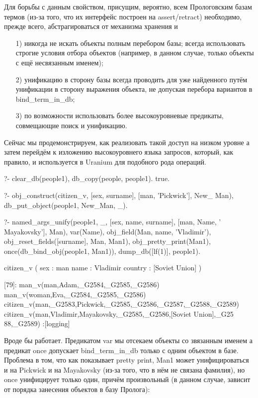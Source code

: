 \documentclass[a4paper]{book}
\def\ur{Uranium}
\begin{document}
Для борьбы с данным свойством, присущим, вероятно, всем
Прологовским базам термов (из-за того, что их интерфейс построен
на assert/retract) необходимо, прежде всего, абстрагироваться от
механизма хранения и 
\begin{itemize}
\item[1)] никогда не искать объекты полным перебором базы; всегда
  использовать строгие условия отбора объектов (например, в
  данном случае, только объекты с ещё несвязанным именем);
\item[2)] унификацию в сторону базы всегда проводить для уже
  найденного путём унификации в сторону выражения объекта, не
  допуская перебора вариантов в bind_term_in_db;
\item[3)] по возможности использовать более высокоуровневые
  предикаты, совмещающие поиск и унификацию.
\end{itemize}

Сейчас мы продемонстрируем, как реализовать такой доступ на
низком уровне а затем перейдём к изложению высокоуровнего языка
запросов, который, как правило, и используется в \ur{} для
подобного рода операций.

\begin{example}{}{}
?- clear_db(people1), db_copy(people, people1).
true.

?- obj_construct(citizen_v, 
      [sex, surname], [man, 'Pickwick'], New_ Man), 
   db_put_object(people1, New_Man, _).
\end{example}

\begin{example}{}{}
?- named_args_unify(people1, _, 
      [sex, name, surname], [man, Name, ' Mayakovsky'], Man), 
   var(Name), 
   obj_field(Man, name, 'Vladimir'), 
   obj_reset_fields([surname], Man, Man1), 
   obj_pretty_print(Man1), 
   once(db_bind_obj(people1, Man1)), 
   dump_db([lf(1)], people1).

citizen_v ( 
  sex : man 
  name : Vladimir 
  country : [Soviet Union] 
) 

[79]: man_v(man,Adam,_G2584,_G2585,_G2586) 
man_v(woman,Eva,_G2584,_G2585,_G2586) 
citizen_v(man,_G2583,Pickwick,_G2585,_G2586,_G2587,_G2588,_G2589) 
citizen_v(man,Vladimir,Mayakovsky,_G2585,_G2586,[Soviet Union],_G25
88,_G2589)                                                        
 :[logging]
\end{example}

Вроде бы работает. Предикатом var мы отсекаем объекты со
звязанным именем а предикат once допускает bind_term_in_db
только с одним объектом в базе. Проблема в том, что как
показывает pretty print, Man1 может унифицироваться и на Pickwick
и на Mayakovsky (из-за того, что в нём не связана фамилия), но
once унифицирует только один, причём произвольный (в данном
случае, зависит от порядка занесения объектов в базу Пролога):
\end{document}
